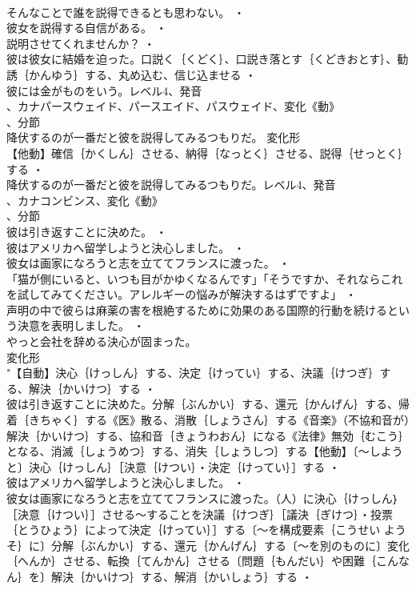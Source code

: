 \documentclass[8pt]{extreport}
\begin{document}
\begin{CJK}{UTF8}{min}
\\	そんなことで誰を説得できるとも思わない。 ・
\\	彼女を説得する自信がある。 ・
\\	説明させてくれませんか？ ・
\\	彼は彼女に結婚を迫った。口説く｛くどく｝、口説き落とす｛くどきおとす｝、勧誘｛かんゆう｝する、丸め込む、信じ込ませる ・
\\	彼には金がものをいう。レベル4、発音
\\	、カナパースウェイド、パースエイド、パスウェイド、変化《動》
\\	、分節
\\	降伏するのが一番だと彼を説得してみるつもりだ。	変化形 
\\	【他動】確信｛かくしん｝させる、納得｛なっとく｝させる、説得｛せっとく｝する ・
\\	降伏するのが一番だと彼を説得してみるつもりだ。レベル4、発音
\\	、カナコンビンス、変化《動》
\\	、分節
\\	彼は引き返すことに決めた。 ・
\\	彼はアメリカへ留学しようと決心しました。 ・
\\	彼女は画家になろうと志を立ててフランスに渡った。 ・
\\	「猫が側にいると、いつも目がかゆくなるんです」「そうですか、それならこれを試してみてください。アレルギーの悩みが解決するはずですよ」 ・
\\	声明の中で彼らは麻薬の害を根絶するために効果のある国際的行動を続けるという決意を表明しました。 ・
\\	やっと会社を辞める決心が固まった。
\\	変化形 
\\	"【自動】決心｛けっしん｝する、決定｛けってい｝する、決議｛けつぎ｝する、解決｛かいけつ｝する ・
\\	彼は引き返すことに決めた。分解｛ぶんかい｝する、還元｛かんげん｝する、帰着｛きちゃく｝する《医》散る、消散｛しょうさん｝する《音楽》（不協和音が）解決｛かいけつ｝する、協和音｛きょうわおん｝になる《法律》無効｛むこう｝となる、消滅｛しょうめつ｝する、消失｛しょうしつ｝する【他動】〔～しようと〕決心｛けっしん｝［決意｛けつい｝・決定｛けってい｝］する ・
\\	彼はアメリカへ留学しようと決心しました。 ・
\\	彼女は画家になろうと志を立ててフランスに渡った。（人）に決心｛けっしん｝［決意｛けつい｝］させる～することを決議｛けつぎ｝［議決｛ぎけつ｝・投票｛とうひょう｝によって決定｛けってい｝］する〔～を構成要素｛こうせい ようそ｝に〕分解｛ぶんかい｝する、還元｛かんげん｝する〔～を別のものに〕変化｛へんか｝させる、転換｛てんかん｝させる〔問題｛もんだい｝や困難｛こんなん｝を〕解決｛かいけつ｝する、解消｛かいしょう｝する ・

\end{CJK}
\end{document}
